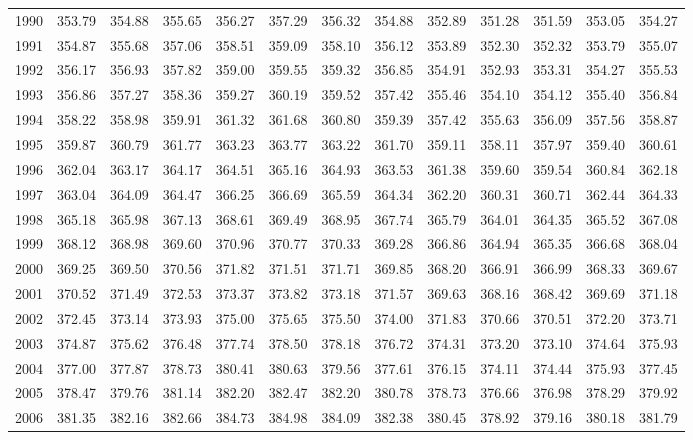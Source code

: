 \documentclass[11pt, a4paper]{article} %
\begin{document}
\begin{table}[ht]
{\begin{tabular}{rrrrrrrrrrrrr}
  1990 & 353.79 & 354.88 & 355.65 & 356.27 & 357.29 & 356.32 & 354.88 & 352.89 & 351.28 & 351.59 & 353.05 & 354.27 \\ 
  1991 & 354.87 & 355.68 & 357.06 & 358.51 & 359.09 & 358.10 & 356.12 & 353.89 & 352.30 & 352.32 & 353.79 & 355.07 \\ 
  1992 & 356.17 & 356.93 & 357.82 & 359.00 & 359.55 & 359.32 & 356.85 & 354.91 & 352.93 & 353.31 & 354.27 & 355.53 \\ 
  1993 & 356.86 & 357.27 & 358.36 & 359.27 & 360.19 & 359.52 & 357.42 & 355.46 & 354.10 & 354.12 & 355.40 & 356.84 \\ 
  1994 & 358.22 & 358.98 & 359.91 & 361.32 & 361.68 & 360.80 & 359.39 & 357.42 & 355.63 & 356.09 & 357.56 & 358.87 \\ 
  1995 & 359.87 & 360.79 & 361.77 & 363.23 & 363.77 & 363.22 & 361.70 & 359.11 & 358.11 & 357.97 & 359.40 & 360.61 \\ 
  1996 & 362.04 & 363.17 & 364.17 & 364.51 & 365.16 & 364.93 & 363.53 & 361.38 & 359.60 & 359.54 & 360.84 & 362.18 \\ 
  1997 & 363.04 & 364.09 & 364.47 & 366.25 & 366.69 & 365.59 & 364.34 & 362.20 & 360.31 & 360.71 & 362.44 & 364.33 \\ 
  1998 & 365.18 & 365.98 & 367.13 & 368.61 & 369.49 & 368.95 & 367.74 & 365.79 & 364.01 & 364.35 & 365.52 & 367.08 \\ 
  1999 & 368.12 & 368.98 & 369.60 & 370.96 & 370.77 & 370.33 & 369.28 & 366.86 & 364.94 & 365.35 & 366.68 & 368.04 \\ 
  2000 & 369.25 & 369.50 & 370.56 & 371.82 & 371.51 & 371.71 & 369.85 & 368.20 & 366.91 & 366.99 & 368.33 & 369.67 \\ 
  2001 & 370.52 & 371.49 & 372.53 & 373.37 & 373.82 & 373.18 & 371.57 & 369.63 & 368.16 & 368.42 & 369.69 & 371.18 \\ 
  2002 & 372.45 & 373.14 & 373.93 & 375.00 & 375.65 & 375.50 & 374.00 & 371.83 & 370.66 & 370.51 & 372.20 & 373.71 \\ 
  2003 & 374.87 & 375.62 & 376.48 & 377.74 & 378.50 & 378.18 & 376.72 & 374.31 & 373.20 & 373.10 & 374.64 & 375.93 \\ 
  2004 & 377.00 & 377.87 & 378.73 & 380.41 & 380.63 & 379.56 & 377.61 & 376.15 & 374.11 & 374.44 & 375.93 & 377.45 \\ 
  2005 & 378.47 & 379.76 & 381.14 & 382.20 & 382.47 & 382.20 & 380.78 & 378.73 & 376.66 & 376.98 & 378.29 & 379.92 \\ 
  2006 & 381.35 & 382.16 & 382.66 & 384.73 & 384.98 & 384.09 & 382.38 & 380.45 & 378.92 & 379.16 & 380.18 & 381.79 \\ 

\end{tabular}}
\end{table}
\end{document}
